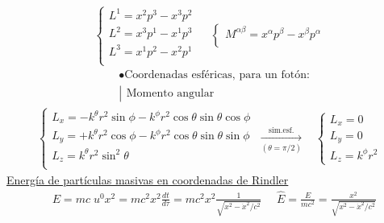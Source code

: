 \begin{align*}
    \begin{cases} 
   L^1= x^2 p^3-x^3 p^2 \\
L^2 = x^3 p^1 - x^1p^3\\
L^3=x^1 p^2 -x^2 p^1\\
\end{cases}\; \hspace{11pt}
\begin{cases} 
M^{\alpha\beta}=x^\alpha p^\beta -x^\beta p^\alpha\\
\end{cases}
\end{align*}
\begin{align*}
&\bullet\text{Coordenadas esféricas, para un fotón:}\\
&    \left|
\begin{array}{l}
\text{Momento angular}
\end{array}
\right.
\end{align*}
\begin{align*}
    \begin{cases} 
   L_x=-k^\theta r^2 \sin \phi-k ^\phi r^2 \cos\theta \sin \theta \cos\phi\\
L_y=+k^\theta r^2 \cos \phi-k ^\phi r^2 \cos\theta \sin \theta \sin\phi \\
L_z= k^\theta r^2 \sin ^2 \theta\\
\end{cases}\; \xrightarrow[(\theta=\pi/2)]{\text{sim.esf.}}\hspace{11pt}
\begin{cases} 
L_x=0\\
L_y=0\\
L_z=k^\phi r^2 
\end{cases}
\end{align*}
\underline{Energía de partículas masivas en coordenadas de Rindler}\; 
\begin{align*}
&E=   mc\; u^0x^2=mc^2 x^2  \frac{dt}{d\tau}= mc^2 x^2 \frac{1}{\sqrt{x^2- \dot{x}^2 /c^2}}\;\; \; \; \:  \hat{E}=\frac{E}{mc^2 }= \frac{x^2}{\sqrt{x^2 - \dot{x}^2 /c^2 }}
\end{align*}